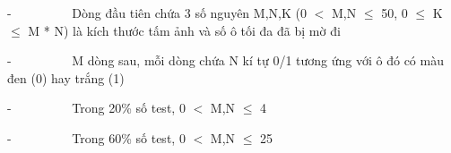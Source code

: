 -          Dòng đầu tiên chứa 3 số nguyên M,N,K (0 $<$ M,N  $\le$  50, 0  $\le$  K  $\le$  M * N) là kích thước tấm ảnh và số ô tối đa đã bị mờ đi

-          M dòng sau, mỗi dòng chứa N kí tự 0/1 tương ứng với ô đó có màu đen (0) hay trắng (1)

-          Trong 20\% số test, 0 $<$ M,N  $\le$  4

-          Trong 60\% số test, 0 $<$ M,N  $\le$  25

\
